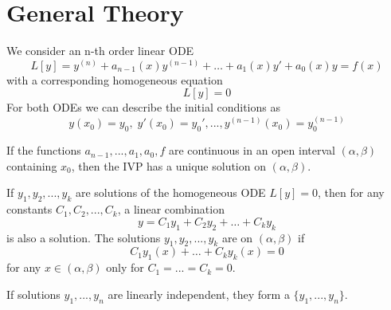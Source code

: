 \documentclass[12pt, a4paper, oneside, openright, titlepage]{book}
\begin{document}
\section{General Theory}

\begin{defn}
        We consider an n-th order linear ODE \begin{equation}
                L[y]=y^{(n)}+a_{n-1}(x)y^{(n-1)}+\hdots +a_1(x)y'+a_0(x)y =f(x)
        \end{equation}
        with a corresponding homogeneous equation \begin{equation}
                L[y] = 0
        \end{equation}
        For both ODEs we can describe the initial conditions as \begin{equation}
                y(x_0) = y_0,\;y'(x_0) = y_0',...,y^{(n-1)}(x_0)=y_0^{(n-1)}
        \end{equation}
\end{defn}




\begin{thm}
        If the functions $a_{n-1},...,a_1,a_0,f$ are continuous in an open interval $(\alpha,\beta)$ containing $x_0$, then the IVP has a unique solution on $(\alpha,\beta)$.
\end{thm}




\begin{thm}
        If $y_1,y_2,...,y_k$ are solutions of the homogeneous ODE $L[y] = 0$, then for any constants $C_1,C_2,...,C_k$, a linear combination \begin{equation}
                y = C_1y_1+C_2y_2+\hdots + C_ky_k
        \end{equation}
        is also a solution. The solutions $y_1,y_2,...,y_k$ are  on $(\alpha,\beta)$ if $$C_1y_1(x)+\hdots+C_ky_k(x) = 0$$ for any $x \in (\alpha,\beta)$ only for $C_1=...=C_k=0$.
\end{thm}




\begin{defn}
        If solutions $y_1,...,y_n$ are linearly independent, they form a  $\{y_1,...,y_n\}$.
\end{defn}


\end{document}
